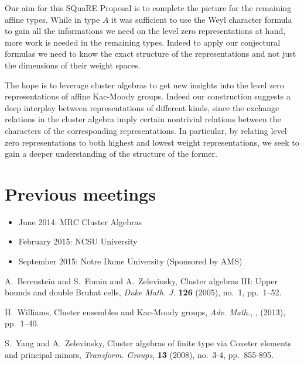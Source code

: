 \documentclass{amsart}
\begin{document}
  Our aim for this SQuaRE Proposal is to complete the picture for the remaining affine types.
  While in type $A$ it was sufficient to use the Weyl character formula to gain all the informations we need on the level zero representations at hand, more work is needed in the remaining types.
  Indeed to apply our conjectural formulas we need to know the exact structure of the representations and not just the dimensions of their weight spaces. 
  
  The hope is to leverage cluster algebras to get new insights into the level zero representations of affine Kac-Moody groups. 
  Indeed our construction suggests a deep interplay between representations of different kinds, since the exchange relations in the cluster algebra imply certain nontrivial relations between the characters of the corresponding representations.  
  In particular, by relating level zero representations to both highest and lowest weight representations, we seek to gain a deeper understanding of the structure of the former. 
  

  \section*{Previous meetings}
  \begin{itemize}
    \item 
      June 2014: MRC Cluster Algebras
    \item
      February 2015: NCSU University
    \item
      September 2015: Notre Dame University (Sponsored by AMS)
  \end{itemize}

  \begin{thebibliography}{XXX}
    A.~Berenstein and S.~Fomin and A.~Zelevinsky, Cluster algebras III: Upper bounds and double Bruhat cells, \textsl{Duke Math. J.} \textbf{126} (2005), no.~1, pp.~1--52.

    H.~Williams, Cluster ensembles and Kac-Moody groups, \textsl{Adv. Math.}, , (2013), pp.~1--40.

    S.~Yang and A.~Zelevinsky, Cluster algebras of finite type via Coxeter elements and principal minors, \textsl{Transform. Groups}, \textbf{13} (2008), no.~3-4, pp.~855-895.
    
  \end{thebibliography}
\end{document}

